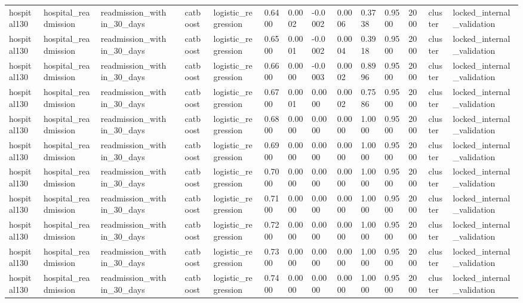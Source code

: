 \begin{tabular}{lllllllllllllll}
hospital130 & hospital\_readmission & readmission\_within\_30\_days &  & catboost & logistic\_regression & 0.6400 & 0.0002 & -0.0002 & 0.0006 & 0.3738 & 0.9500 & 2000 & cluster & locked\_internal\_validation \\
hospital130 & hospital\_readmission & readmission\_within\_30\_days &  & catboost & logistic\_regression & 0.6500 & 0.0001 & -0.0002 & 0.0004 & 0.3918 & 0.9500 & 2000 & cluster & locked\_internal\_validation \\
hospital130 & hospital\_readmission & readmission\_within\_30\_days &  & catboost & logistic\_regression & 0.6600 & 0.0000 & -0.0003 & 0.0002 & 0.8996 & 0.9500 & 2000 & cluster & locked\_internal\_validation \\
hospital130 & hospital\_readmission & readmission\_within\_30\_days &  & catboost & logistic\_regression & 0.6700 & 0.0001 & 0.0000 & 0.0002 & 0.7586 & 0.9500 & 2000 & cluster & locked\_internal\_validation \\
hospital130 & hospital\_readmission & readmission\_within\_30\_days &  & catboost & logistic\_regression & 0.6800 & 0.0000 & 0.0000 & 0.0000 & 1.0000 & 0.9500 & 2000 & cluster & locked\_internal\_validation \\
hospital130 & hospital\_readmission & readmission\_within\_30\_days &  & catboost & logistic\_regression & 0.6900 & 0.0000 & 0.0000 & 0.0000 & 1.0000 & 0.9500 & 2000 & cluster & locked\_internal\_validation \\
hospital130 & hospital\_readmission & readmission\_within\_30\_days &  & catboost & logistic\_regression & 0.7000 & 0.0000 & 0.0000 & 0.0000 & 1.0000 & 0.9500 & 2000 & cluster & locked\_internal\_validation \\
hospital130 & hospital\_readmission & readmission\_within\_30\_days &  & catboost & logistic\_regression & 0.7100 & 0.0000 & 0.0000 & 0.0000 & 1.0000 & 0.9500 & 2000 & cluster & locked\_internal\_validation \\
hospital130 & hospital\_readmission & readmission\_within\_30\_days &  & catboost & logistic\_regression & 0.7200 & 0.0000 & 0.0000 & 0.0000 & 1.0000 & 0.9500 & 2000 & cluster & locked\_internal\_validation \\
hospital130 & hospital\_readmission & readmission\_within\_30\_days &  & catboost & logistic\_regression & 0.7300 & 0.0000 & 0.0000 & 0.0000 & 1.0000 & 0.9500 & 2000 & cluster & locked\_internal\_validation \\
hospital130 & hospital\_readmission & readmission\_within\_30\_days &  & catboost & logistic\_regression & 0.7400 & 0.0000 & 0.0000 & 0.0000 & 1.0000 & 0.9500 & 2000 & cluster & locked\_internal\_validation \\

\end{tabular}
